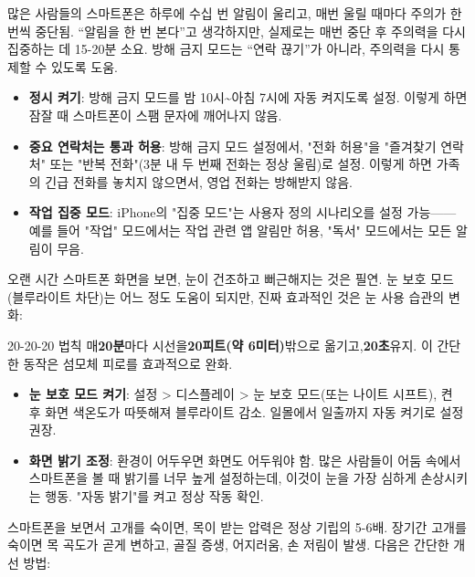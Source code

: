 많은 사람들의 스마트폰은 하루에 수십 번 알림이 울리고, 매번 울릴 때마다 주의가 한 번씩 중단됨. “알림을 한 번 본다”고 생각하지만, 실제로는 매번 중단 후 주의력을 다시 집중하는 데 15-20분 소요. 방해 금지 모드는 “연락 끊기”가 아니라, 주의력을 다시 통제할 수 있도록 도움.

\begin{itemize}
  \item \textbf{정시 켜기}: 방해 금지 모드를 밤 10시\textasciitilde{}아침 7시에 자동 켜지도록 설정. 이렇게 하면 잠잘 때 스마트폰이 스팸 문자에 깨어나지 않음.
  \item \textbf{중요 연락처는 통과 허용}: 방해 금지 모드 설정에서, "전화 허용"을 "즐겨찾기 연락처" 또는 "반복 전화"(3분 내 두 번째 전화는 정상 울림)로 설정. 이렇게 하면 가족의 긴급 전화를 놓치지 않으면서, 영업 전화는 방해받지 않음.
  \item \textbf{작업 집중 모드}: iPhone의 "집중 모드"는 사용자 정의 시나리오를 설정 가능——예를 들어 "작업" 모드에서는 작업 관련 앱 알림만 허용, "독서" 모드에서는 모든 알림이 무음.
\end{itemize}


오랜 시간 스마트폰 화면을 보면, 눈이 건조하고 뻐근해지는 것은 필연. 눈 보호 모드(블루라이트 차단)는 어느 정도 도움이 되지만, 진짜 효과적인 것은 눈 사용 습관의 변화:

\begin{tcbinfo}{20-20-20 법칙}
매\textbf{20분}마다 시선을\textbf{20피트(약 6미터)}밖으로 옮기고,\textbf{20초}유지. 이 간단한 동작은 섬모체 피로를 효과적으로 완화.

\end{tcbinfo}

\begin{itemize}
  \item \textbf{눈 보호 모드 켜기}: 설정 > 디스플레이 > 눈 보호 모드(또는 나이트 시프트), 켠 후 화면 색온도가 따뜻해져 블루라이트 감소. 일몰에서 일출까지 자동 켜기로 설정 권장.
  \item \textbf{화면 밝기 조정}: 환경이 어두우면 화면도 어두워야 함. 많은 사람들이 어둠 속에서 스마트폰을 볼 때 밝기를 너무 높게 설정하는데, 이것이 눈을 가장 심하게 손상시키는 행동. "자동 밝기"를 켜고 정상 작동 확인.
\end{itemize}


스마트폰을 보면서 고개를 숙이면, 목이 받는 압력은 정상 기립의 5-6배. 장기간 고개를 숙이면 목 곡도가 곧게 변하고, 골질 증생, 어지러움, 손 저림이 발생. 다음은 간단한 개선 방법:


